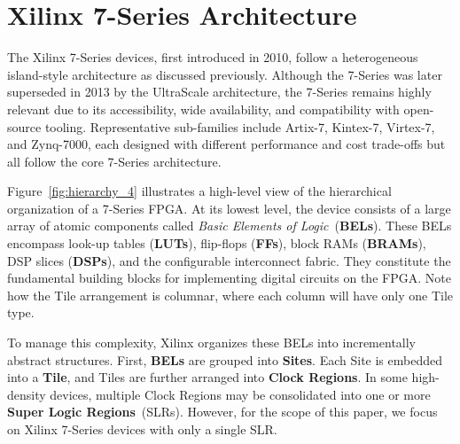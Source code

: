 
\section{Xilinx 7-Series Architecture}
\label{sec:7_series}
The Xilinx 7-Series devices, first introduced in 2010, follow a heterogeneous island-style architecture as discussed previously. 
Although the 7-Series was later superseded in 2013 by the UltraScale architecture, the 7-Series remains highly relevant due to its accessibility, wide availability, and compatibility with open-source tooling. 
Representative sub-families include Artix-7, Kintex-7, Virtex-7, and Zynq-7000, each designed with different performance and cost trade-offs but all follow the core 7-Series architecture.


Figure~\ref{fig:hierarchy_4} illustrates a high-level view of the hierarchical organization of a 7-Series FPGA. 
At its lowest level, the device consists of a large array of atomic components called \emph{Basic Elements of Logic}~(\textbf{BELs}). 
These BELs encompass look-up tables (\textbf{LUTs}), flip-flops (\textbf{FFs}), block RAMs (\textbf{BRAMs}), DSP slices (\textbf{DSPs}), and the configurable interconnect fabric. 
They constitute the fundamental building blocks for implementing digital circuits on the FPGA.
Note how the Tile arrangement is columnar, where each column will have only one Tile type. 

To manage this complexity, Xilinx organizes these BELs into incrementally abstract structures. 
First, \textbf{BELs} are grouped into \textbf{Sites}. 
Each Site is embedded into a \textbf{Tile}, and Tiles are further arranged into \textbf{Clock Regions}. 
In some high-density devices, multiple Clock Regions may be consolidated into one or more \textbf{Super Logic Regions}~(SLRs). 
However, for the scope of this paper, we focus on Xilinx 7-Series devices with only a single SLR.


